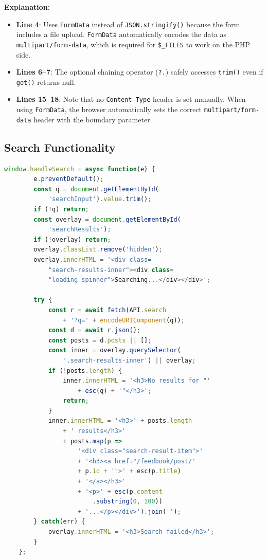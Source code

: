 \documentclass[12pt,a4paper]{report}
\begin{document}
\textbf{Explanation:}
\begin{itemize}
    \item \textbf{Line 4}: Uses \texttt{FormData} instead of \texttt{JSON.stringify()} because the form includes a file upload. \texttt{FormData} automatically encodes the data as \texttt{multipart/form-data}, which is required for \texttt{\$\_FILES} to work on the PHP side.
    \item \textbf{Lines 6--7}: The optional chaining operator (\texttt{?.}) safely accesses \texttt{trim()} even if \texttt{get()} returns null.
    \item \textbf{Lines 15--18}: Note that no \texttt{Content-Type} header is set manually. When using \texttt{FormData}, the browser automatically sets the correct \texttt{multipart/form-data} header with the boundary parameter.
\end{itemize}

\subsection{Search Functionality}

\begin{lstlisting}[language=JavaScript]
    window.handleSearch = async function(e) {
        e.preventDefault();
        const q = document.getElementById(
            'searchInput').value.trim();
        if (!q) return;
        const overlay = document.getElementById(
            'searchResults');
        if (!overlay) return;
        overlay.classList.remove('hidden');
        overlay.innerHTML = '<div class=
            "search-results-inner"><div class=
            "loading-spinner">Searching...</div></div>';

        try {
            const r = await fetch(API.search
                + '?q=' + encodeURIComponent(q));
            const d = await r.json();
            const posts = d.posts || [];
            const inner = overlay.querySelector(
                '.search-results-inner') || overlay;
            if (!posts.length) {
                inner.innerHTML = '<h3>No results for "'
                    + esc(q) + '"</h3>';
                return;
            }
            inner.innerHTML = '<h3>' + posts.length
                + ' results</h3>'
                + posts.map(p =>
                    '<div class="search-result-item">'
                    + '<h3><a href="/feedbook/post/'
                    + p.id + '">' + esc(p.title)
                    + '</a></h3>'
                    + '<p>' + esc(p.content
                        .substring(0, 100))
                    + '...</p></div>').join('');
        } catch(err) {
            overlay.innerHTML = '<h3>Search failed</h3>';
        }
    };
\end{lstlisting}
\end{document}
